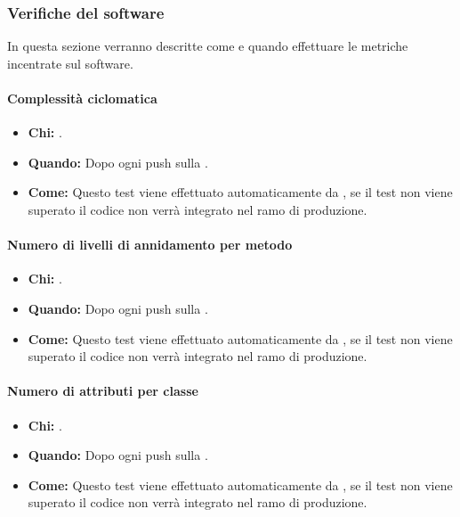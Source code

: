 \newpage
\subsubsection{Verifiche del software}
In questa sezione verranno descritte come e quando effettuare le metriche incentrate sul software.

\paragraph{Complessità ciclomatica}
\begin{itemize}
\item \textbf{Chi:} .
\item \textbf{Quando:} Dopo ogni push sulla .
\item \textbf{Come:} Questo test viene effettuato automaticamente da , se il test non viene superato il codice non verrà integrato nel ramo di produzione.
\end{itemize}

\paragraph{Numero di livelli di annidamento per metodo}
\begin{itemize}
\item \textbf{Chi:} .
\item \textbf{Quando:} Dopo ogni push sulla .
\item \textbf{Come:} Questo test viene effettuato automaticamente da , se il test non viene superato il codice non verrà integrato nel ramo di produzione.
\end{itemize}

\paragraph{Numero di attributi per classe}
\begin{itemize}
\item \textbf{Chi:} .
\item \textbf{Quando:} Dopo ogni push sulla .
\item \textbf{Come:} Questo test viene effettuato automaticamente da , se il test non viene superato il codice non verrà integrato nel ramo di produzione.
\end{itemize}

